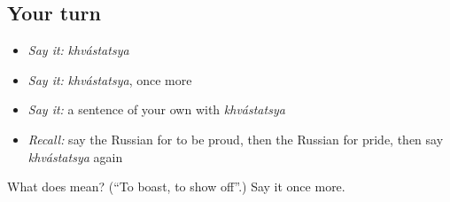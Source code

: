 \subsection*{Your turn}
\begin{itemize}
\raggedright
  \item \emph{Say it:} \emph{khvástatsya}
  \item \emph{Say it:} \emph{khvástatsya}, once more
  \item \emph{Say it:} a sentence of your own with \emph{khvástatsya}
  \item \emph{Recall:} say the Russian for to be proud, then the Russian for pride, then say \emph{khvástatsya} again
\end{itemize}

\begin{tcolorbox}[breakable,colback=teal!4,colframe=teal!35!black,title={Before you move on}]
What does  mean? (\textquotedblleft{}To boast, to show off\textquotedblright{}.) Say it once more.
\end{tcolorbox}
